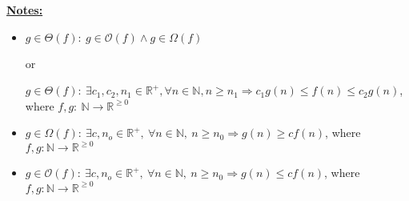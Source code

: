 \documentclass[12pt]{article}
\begin{document}
\begin{mdframed}
\begin{enumerate}[1.]
\begin{mdframed}
        \end{mdframed}
    \end{enumerate}

\end{mdframed}

\bigskip

\underline{\textbf{Notes:}}

\bigskip

\begin{itemize}
    \item
    $g \in \Theta(f):\: g \in \mathcal{O}(f) \land g \in \Omega(f)$

    or

    $g \in \Theta(f):\:\exists c_1,c_2,n_1 \in \mathbb{R}^{+}, \forall n \in \mathbb{N}, n \geq n_1
    \Rightarrow c_1g(n) \leq f(n) \leq c_2g(n)$, where $f,g:\:\mathbb{N} \to \mathbb{R}^{\geq 0}$

    \item
    $g \in \Omega(f):\:\exists c,n_o \in \mathbb{R}^{+},\:\forall n \in
    \mathbb{N},\:n \geq n_0 \Rightarrow g(n) \geq cf(n)$, where $f,g:\mathbb{N} \to \mathbb{R}^{\geq 0}$

    \item

    $g \in \mathcal{O}(f):\:\exists c,n_o \in \mathbb{R}^{+},\:\forall n \in
    \mathbb{N},\:n \geq n_0 \Rightarrow g(n) \leq cf(n)$, where $f,g:\mathbb{N} \to \mathbb{R}^{\geq 0}$
\end{itemize}
\end{document}
